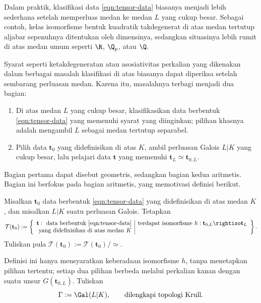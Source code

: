 Dalam praktik, klasifikasi data \eqref{eqn:tensor-data} biasanya menjadi
lebih sederhana setelah memperluas medan ke medan $L$ yang cukup besar.
Sebagai contoh, kelas isomorfisme bentuk kuadratik takdegenerat di atas medan
tertutup aljabar sepenuhnya ditentukan oleh dimensinya, sedangkan situasinya
lebih rumit di atas medan umum seperti $\R$, $\Q_p$, atau $\Q$.

Syarat seperti ketakdegeneratan atau asosiativitas perkalian yang dikenakan
	dalam berbagai masalah klasifikasi di atas biasanya dapat diperiksa setelah
	sembarang perluasan medan. Karena itu, masalahnya terbagi menjadi dua bagian:
\begin{enumerate}
	\item Di atas medan $L$ yang cukup besar, klasifikasikan data berbentuk
	\eqref{eqn:tensor-data} yang memenuhi syarat yang diinginkan; pilihan
	khasnya adalah mengambil $L$ sebagai medan tertutup separabel.
	\item Pilih data $\mathbf{t}_0$ yang didefinisikan di atas $K$, ambil
	perluasan Galois $L|K$ yang cukup besar, lalu pelajari data $\mathbf{t}$
	yang memenuhi $\mathbf{t}_L\simeq\mathbf{t}_{0,L}$.
\end{enumerate}
Bagian pertama dapat disebut geometris, sedangkan bagian kedua aritmetis.
Bagian ini berfokus pada bagian aritmetis, yang memotivasi definisi berikut.

\begin{definition}
	Misalkan $\mathbf{t}_0$ data berbentuk \eqref{eqn:tensor-data} yang
	didefinisikan di atas medan $K$, dan misalkan $L|K$ suatu perluasan
	Galois. Tetapkan
	\[
	\mathcal{T}(\mathbf{t}_0):=
	\left\{
	\begin{array}{r|l}
		\mathbf{t}:\text{ data berbentuk \eqref{eqn:tensor-data}}
		& \text{terdapat isomorfisme }h:\mathbf{t}_{0,L}\rightiso\mathbf{t}_L \\
		\text{yang didefinisikan di atas medan $K$}&
	\end{array}
	\right\}.
	\]
	Tuliskan pula
	$\mathscr{T}(\mathbf{t}_0):=\mathcal{T}(\mathbf{t}_0)/\simeq$.
\end{definition}

Definisi ini hanya mensyaratkan keberadaan isomorfisme $h$, tanpa menetapkan
pilihan tertentu; setiap dua pilihan berbeda melalui perkalian kanan dengan
suatu unsur $G(\mathbf{t}_{0,L})$. Tuliskan
\[
\Gamma:=\Gal(L|K),\qquad\text{dilengkapi topologi Krull}.
\]

